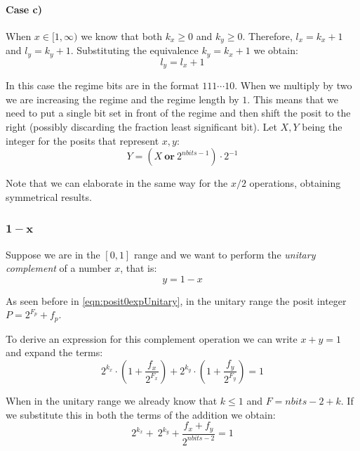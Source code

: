 \paragraph{Case c)} When $x \in [1,\infty)$ we know that both $k_x \geq 0$ and $k_y \geq 0$. Therefore, $l_x = k_x + 1$ and $l_y = k_y + 1$. Substituting the equivalence $k_y = k_x + 1$ we obtain:
\begin{equation}
    l_y = l_x + 1
\end{equation}

In this case the regime bits are in the format $111 \cdots 10$. When we multiply by two we are increasing the regime and the regime length by $1$. This means that we need to put a single bit set in front of the regime and then shift the posit to the right (possibly discarding the fraction least significant bit). Let $X,Y$ being the integer for the posits that represent $x,y$:
\begin{equation}
    Y = (X\ \mathbf{or}\ 2^{nbits - 1}) \cdot 2^{-1}
\end{equation}

Note that we can elaborate in the same way for the $x/2$ operations, obtaining symmetrical results.



\subsubsection{$\mathbf{1-x}$}

Suppose we are in the $[0,1]$ range and we want to perform the \textit{unitary complement} of a number $x$, that is:
\begin{equation}
    y = 1 - x    
\end{equation}

As seen before in \eqref{eqn:posit0expUnitary}, in the unitary range the posit integer $P = 2^{F_p} + f_p$. 

To derive an expression for this complement operation we can write $x + y = 1$ and expand the terms:
\begin{equation}
    2^{k_x} \cdot \left(1 + \frac{f_x}{2^{F_x}} \right) + 2^{k_y} \cdot \left(1 + \frac{f_y}{2^{F_y}} \right) = 1
\end{equation}

When in the unitary range we already know that $k \leq 1$ and $F = nbits - 2 + k$. If we substitute this in both the terms of the addition we obtain:
\begin{equation}
    2^{k_x} + \ 2^{k_y} + \frac{f_x + f_y}{2^{nbits - 2}} = 1
\end{equation}

